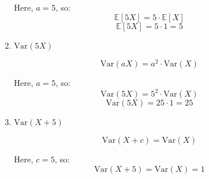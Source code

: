 \documentclass[letter]{article}
\theoremstyle{definition}
\newcommand{\Var}{\mathrm{Var}}
\newenvironment{soln}{
	\leavevmode\color{black}\ignorespaces
}{}
\begin{document}
\begin{enumerate}
\begin{enumerate}
\begin{soln}
			Here, $a = 5$, so:
			\[
			\mathbb{E}[5X] = 5 \cdot \mathbb{E}[X]
			\]
			\[
			\mathbb{E}[5X] = 5 \cdot 1 = 5
			\]
		      \end{soln}
			\item $\Var(5X)$\\
			\begin{soln}
			\[
			\Var(aX) = a^2 \cdot \Var(X)
			\]
			
			Here, $a = 5$, so:
			\[
			\Var(5X) = 5^2 \cdot \Var(X)
			\]
			\[
			\Var(5X) = 25 \cdot 1 = 25
			\]
		      \end{soln}
			\item $\Var(X+5)$\\
			\begin{soln}
			\[
			\Var(X + c) = \Var(X)
			\]
			
		 Here, $c = 5$, so:
			\[
			\Var(X + 5) = \Var(X) = 1
			\]
		      \end{soln}
		\end{enumerate}
	\end{enumerate}
	
	
\end{document}
